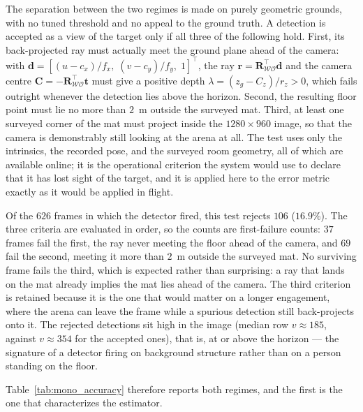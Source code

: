 The separation between the two regimes is made on purely geometric grounds, with
no tuned threshold and no appeal to the ground truth. A detection is accepted as a
view of the target only if all three of the following hold. First, its
back-projected ray must actually meet the ground plane ahead of the camera: with
$\mathbf{d}=[(u-c_x)/f_x,\;(v-c_y)/f_y,\;1]^{\!\top}$, the ray
$\mathbf{r}=\mathbf{R}_{\mathcal{W}\mathcal{O}}^{\!\top}\mathbf{d}$ and the camera
centre $\mathbf{C}=-\mathbf{R}_{\mathcal{W}\mathcal{O}}^{\!\top}\mathbf{t}$ must
give a positive depth $\lambda=(z_g-C_z)/r_z>0$, which fails outright whenever the
detection lies above the horizon. Second, the resulting floor point must lie no
more than $2$~m outside the surveyed mat. Third, at least one surveyed corner of
the mat must project inside the $1280\times960$ image, so that the camera is
demonstrably still looking at the arena at all. The test uses only the intrinsics,
the recorded pose, and the surveyed room geometry, all of which are available
online; it is the operational criterion the system would use to declare that it
has lost sight of the target, and it is applied here to the error metric exactly
as it would be applied in flight.

Of the $626$ frames in which the detector fired, this test rejects $106$
($16.9\%$). The three criteria are evaluated in order, so the counts are
first-failure counts: $37$ frames fail the first, the ray never meeting the floor
ahead of the camera, and $69$ fail the second, meeting it more than $2$~m outside
the surveyed mat. No surviving frame fails the third, which is expected rather
than surprising: a ray that lands on the mat already implies the mat lies ahead of
the camera. The third criterion is retained because it is the one that would
matter on a longer engagement, where the arena can leave the frame while a
spurious detection still back-projects onto it. The rejected detections sit high in the image (median row
$v\approx185$, against $v\approx354$ for the accepted ones), that is, at or above
the horizon --- the signature of a detector firing on background structure rather
than on a person standing on the floor.

Table~\ref{tab:mono_accuracy} therefore reports both regimes, and the first is the
one that characterizes the estimator.

